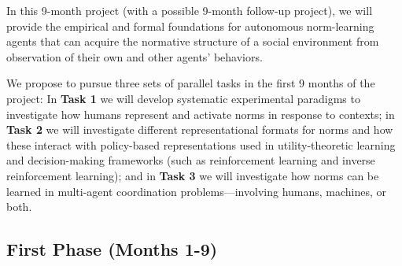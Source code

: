 \documentclass[12pt]{article}
\begin{document}
\vskip 0.1in
\vskip 0.1in

\noindent In this 9-month project (with a possible 9-month follow-up
project), we will provide the empirical and formal foundations for
autonomous norm-learning agents that can acquire the normative
structure of a social environment from observation of their own and
other agents' behaviors.

We propose to pursue three sets of parallel tasks in the first 9
months of the project: In {\bf Task 1} we will develop systematic
experimental paradigms to investigate how humans represent and
activate norms in response to contexts; in {\bf Task 2} we will
investigate different representational formats for norms and how these
interact with policy-based representations used in utility-theoretic
learning and decision-making frameworks (such as reinforcement
learning and inverse reinforcement learning); and in {\bf Task 3} we
will investigate how norms can be learned in multi-agent coordination
problems---involving humans, machines, or both.




\vskip 0.1in
\label{sec:task1}
\vskip 0.1in


\subsection*{First Phase (Months 1-9)}



\end{document}
